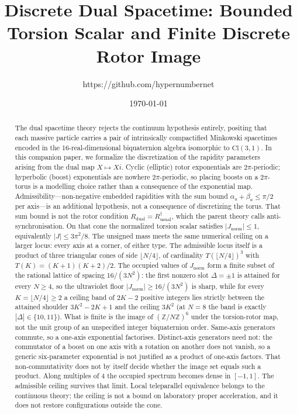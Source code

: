 \documentclass[a4paper]{article}
\title{Discrete Dual Spacetime: Bounded Torsion Scalar and Finite Discrete Rotor Image}
\author{https://github.com/hypernumbernet}
\date{\today}
\theoremstyle{definition}
\newcommand{\Jnorm}{J_{\mathrm{norm}}}
\begin{document}
\maketitle

\begin{abstract}
The dual spacetime theory rejects the continuum hypothesis entirely, positing that each massive particle carries a pair of intrinsically compactified Minkowski spacetimes encoded in the 16-real-dimensional biquaternion algebra isomorphic to $\mathrm{Cl}(3,1)$. In this companion paper, we formalize the discretization of the rapidity parameters arising from the dual map $X \mapsto Xi$. Cyclic (elliptic) rotor exponentials are $2\pi$-periodic; hyperbolic (boost) exponentials are nowhere $2\pi$-periodic, so placing boosts on a $2\pi$-torus is a modelling choice rather than a consequence of the exponential map. Admissibility---non-negative embedded rapidities with the sum bound $\alpha_a+\beta_a\leq\pi/2$ per axis---is an additional hypothesis, not a consequence of discretizing the torus. That sum bound is not the rotor condition $R_{\mathrm{dual}}=R_{\mathrm{usual}}^\dagger$, which the parent theory calls anti-synchronisation. On that cone the normalized torsion scalar satisfies $|\Jnorm|\leq 1$, equivalently $|J|\leq 3\pi^2/8$. The unsigned mass meets the same numerical ceiling on a larger locus: every axis at a corner, of either type. The admissible locus itself is a product of three triangular cones of side $\lfloor N/4\rfloor$, of cardinality $T(\lfloor N/4\rfloor)^3$ with $T(K)=(K+1)(K+2)/2$. The occupied values of $\Jnorm$ form a finite subset of the rational lattice of spacing $16/(3N^2)$: the first nonzero slot $\Delta=\pm 1$ is attained for every $N\geq 4$, so the ultraviolet floor $|\Jnorm|\geq 16/(3N^2)$ is sharp, while for every $K=\lfloor N/4\rfloor\ge 2$ a ceiling band of $2K-2$ positive integers lies strictly between the attained shoulder $3K^2-2K+1$ and the ceiling $3K^2$ (at $N=8$ the band is exactly $|\Delta|\in\{10,11\}$). What is finite is the image of $(\mathbb{Z}/N\mathbb{Z})^6$ under the torsion-rotor map, not the unit group of an unspecified integer biquaternion order. Same-axis generators commute, so a one-axis exponential factorises. Distinct-axis generators need not: the commutator of a boost on one axis with a rotation on another does not vanish, so a generic six-parameter exponential is not justified as a product of one-axis factors. That non-commutativity does not by itself decide whether the image set equals such a product. Along multiples of $4$ the occupied spectrum becomes dense in $[-1,1]$. The admissible ceiling survives that limit. Local teleparallel equivalence belongs to the continuous theory; the ceiling is not a bound on laboratory proper acceleration, and it does not restore configurations outside the cone.
\end{abstract}
\end{document}
